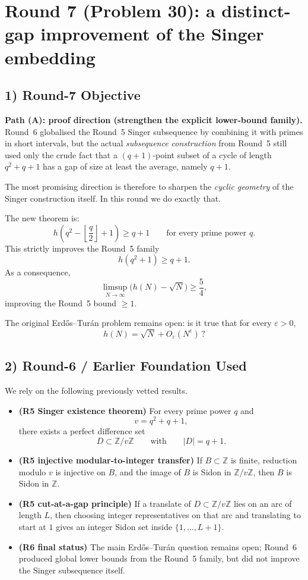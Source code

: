 \section{Round 7 (Problem 30): a distinct-gap improvement of the Singer embedding}

\subsection{1) Round-7 Objective}
\textbf{Path (A): proof direction (strengthen the explicit lower-bound family).}
Round~6 globalised the Round~5 Singer subsequence by combining it with primes in short intervals, but the actual \emph{subsequence construction} from Round~5 still used only the crude fact that a $(q+1)$-point subset of a cycle of length $q^2+q+1$ has a gap of size at least the average, namely $q+1$.

The most promising direction is therefore to sharpen the \emph{cyclic geometry} of the Singer construction itself.
In this round we do exactly that.

The new theorem is:
\[
h\!\left(q^2-\left\lfloor \frac q2\right\rfloor+1\right)\ge q+1
\qquad\text{for every prime power }q.
\]
This strictly improves the Round~5 family
\[
h(q^2+1)\ge q+1.
\]
As a consequence,
\[
\limsup_{N\to\infty}\bigl(h(N)-\sqrt N\bigr)\ge \frac54,
\]
improving the Round~5 bound $\ge 1$.

The original Erd\H{o}s--Tur\'an problem remains open:
is it true that for every $\varepsilon>0$,
\[
h(N)=\sqrt N+O_\varepsilon(N^\varepsilon)\,?
\]

\subsection{2) Round-6 / Earlier Foundation Used}
We rely on the following previously vetted results.

\begin{itemize}
\item \textbf{(R5 Singer existence theorem)} For every prime power $q$ and
\[
v=q^2+q+1,
\]
there exists a perfect difference set
\[
D\subset \mathbb Z/v\mathbb Z
\qquad\text{with}\qquad |D|=q+1.
\]

\item \textbf{(R5 injective modular-to-integer transfer)} If $B\subset \mathbb Z$ is finite, reduction modulo $v$ is injective on $B$, and the image of $B$ is Sidon in $\mathbb Z/v\mathbb Z$, then $B$ is Sidon in $\mathbb Z$.

\item \textbf{(R5 cut-at-a-gap principle)} If a translate of $D\subset \mathbb Z/v\mathbb Z$ lies on an arc of length $L$, then choosing integer representatives on that arc and translating to start at $1$ gives an integer Sidon set inside $\{1,\dots,L+1\}$.

\item \textbf{(R6 final status)} The main Erd\H{o}s--Tur\'an question remains open; Round~6 produced global lower bounds from the Round~5 family, but did not improve the Singer subsequence itself.
\end{itemize}

